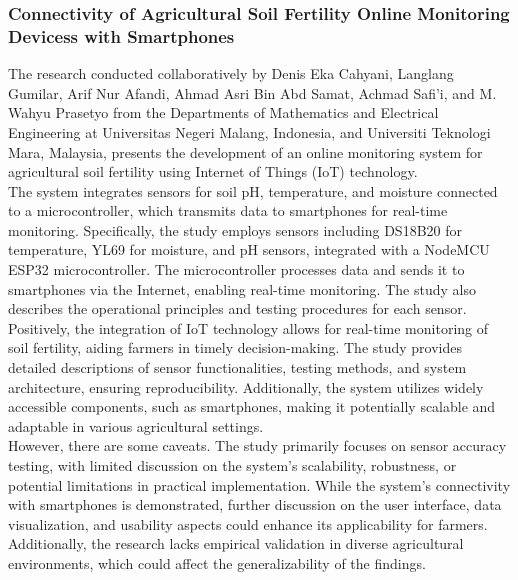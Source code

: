 \documentclass[12pt, a4paper]{article}
\begin{document}
\subsubsection{Connectivity of Agricultural Soil Fertility Online Monitoring Devicess with Smartphones}
The research conducted collaboratively by Denis Eka Cahyani, Langlang Gumilar, Arif Nur Afandi, Ahmad Asri Bin Abd Samat, Achmad Safi'i, and M. Wahyu Prasetyo \cite{cahyani2023connectivity} from the Departments of Mathematics and Electrical Engineering at Universitas Negeri Malang, Indonesia, and Universiti Teknologi Mara, Malaysia, presents the development of an online monitoring system for agricultural soil fertility using Internet of Things (IoT) technology.\\
The system integrates sensors for soil pH, temperature, and moisture connected to a microcontroller, which transmits data to smartphones for real-time monitoring. Specifically, the study employs sensors including DS18B20 for temperature, YL69 for moisture, and pH sensors, integrated with a NodeMCU ESP32 microcontroller. The microcontroller processes data and sends it to smartphones via the Internet, enabling real-time monitoring. The study also describes the operational principles and testing procedures for each sensor.\\
Positively, the integration of IoT technology allows for real-time monitoring of soil fertility, aiding farmers in timely decision-making. The study provides detailed descriptions of sensor functionalities, testing methods, and system architecture, ensuring reproducibility. Additionally, the system utilizes widely accessible components, such as smartphones, making it potentially scalable and adaptable in various agricultural settings.\\
However, there are some caveats. The study primarily focuses on sensor accuracy testing, with limited discussion on the system's scalability, robustness, or potential limitations in practical implementation. While the system's connectivity with smartphones is demonstrated, further discussion on the user interface, data visualization, and usability aspects could enhance its applicability for farmers. Additionally, the research lacks empirical validation in diverse agricultural environments, which could affect the generalizability of the findings.
\end{document}
